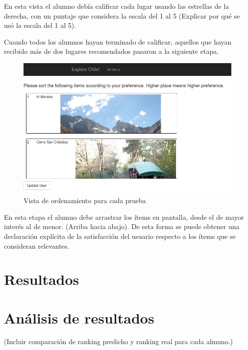 En esta vista el alumno debía calificar cada lugar usando las estrellas de la derecha, con un puntaje que considera la escala del 1 al 5 (Explicar por qué se usó la escala del 1 al 5).

Cuando todos los alumnos hayan terminado de calificar, aquellos que hayan recibido más de dos lugares recomendados pasaron a la siguiente etapa.

\begin{figure}[hbtp]
\centering
\includegraphics[scale=0.75]{images/sort.png}
\caption{Vista de ordenamiento para cada prueba}
\end{figure}  

En esta etapa el alumno debe arrastrar los ítems en pantalla, desde el de mayor interés al de menor. (Arriba hacia abajo). De esta forma se puede obtener una declaración explícita de la satisfacción del usuario respecto a los ítems que se consideran relevantes.

\section{Resultados}

\section{Análisis de resultados}

(Incluir comparación de ranking predicho y ranking real para cada almuno.)

